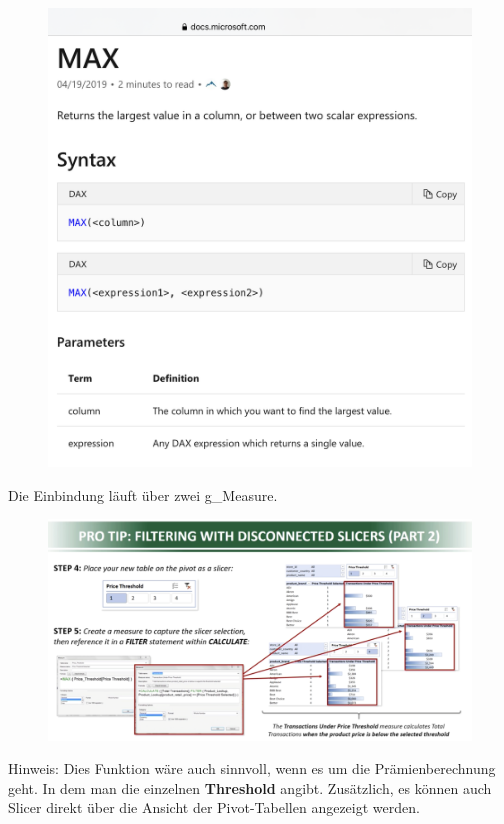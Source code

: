 \begin{figure}[H]
	\centering
	\includegraphics[scale = 0.3]{attachment/chapter_1/screenshot102}
	\caption{}
	\label{fig:screenshot102}
\end{figure} 

Die Einbindung läuft über zwei \gls{g_Measure}.

\begin{figure}[H]
	\centering
	\includegraphics[scale = 0.3]{attachment/chapter_1/screenshot101}
	\caption{}
	\label{fig:screenshot101}
\end{figure} 
Hinweis: Dies Funktion wäre auch sinnvoll, wenn es um die Prämienberechnung geht. In dem man die einzelnen \textbf{Threshold} angibt. 
Zusätzlich, es können auch Slicer direkt über die Ansicht der Pivot-Tabellen angezeigt werden.

